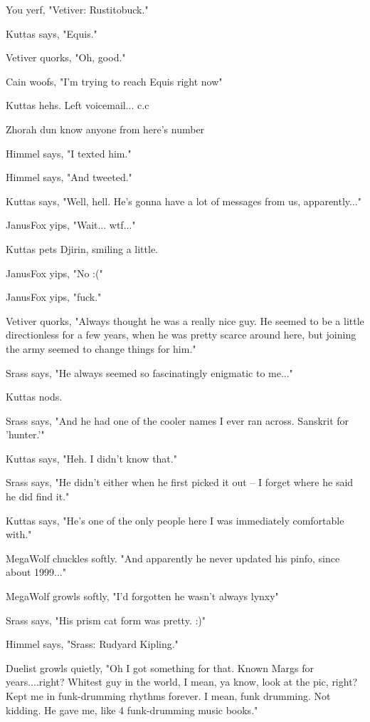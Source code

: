You yerf, "Vetiver: Rustitobuck."

Kuttas says, "Equis."

Vetiver quorks, "Oh, good."

Cain woofs, "I'm trying to reach Equis right now"

Kuttas hehs. Left voicemail... c.c

Zhorah dun know anyone from here's number

Himmel says, "I texted him."

Himmel says, "And tweeted."

Kuttas says, "Well, hell. He's gonna have a lot of messages from us, apparently..."

JanusFox yips, "Wait... wtf..."

Kuttas pets Djirin, smiling a little.

JanusFox yips, "No :("

JanusFox yips, "fuck."

Vetiver quorks, "Always thought he was a really nice guy. He seemed to be a little directionless for a few years, when he was pretty scarce around here, but joining the army seemed to change things for him."

Srass says, "He always seemed so fascinatingly enigmatic to me..."

Kuttas nods.

Srass says, "And he had one of the cooler names I ever ran across.  Sanskrit for 'hunter.'"

Kuttas says, "Heh. I didn't know that."

Srass says, "He didn't either when he first picked it out -- I forget where he said he did find it."

Kuttas says, "He's one of the only people here I was immediately comfortable with."

MegaWolf chuckles softly. "And apparently he never updated his pinfo, since about 1999..."

MegaWolf growls softly, "I'd forgotten he wasn't always lynxy"

Srass says, "His prism cat form was pretty. :)"

Himmel says, "Srass: Rudyard Kipling."

Duelist growls quietly, "Oh I got something for that. Known Margs for years....right? Whitest guy in the world, I mean, ya know, look at the pic, right? Kept me in funk-drumming rhythms forever. I mean, funk drumming. Not kidding. He gave me, like 4 funk-drumming music books."

